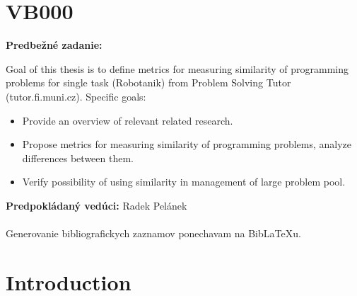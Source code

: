\documentclass[
  digital, %
  table,   %
  nolof,     %
  nolot,     %
  nocover
]{fithesis3}
\begin{document}
\chapter*{VB000}

\begin{otherlanguage}{slovak}
{\bf Predbežné zadanie:}

\noindent
Goal of this thesis is to define metrics for measuring similarity of programming problems for single task (Robotanik) from Problem Solving Tutor (tutor.fi.muni.cz). Specific goals:

\begin{itemize}
\item Provide an overview of relevant related research.
\item Propose metrics for measuring similarity of programming problems, analyze differences between them.
\item Verify possibility of using similarity in management of large problem pool.
\end{itemize}

\noindent
{\bf Predpokládaný vedúci:} Radek Pelánek
\\
\\
\noindent
Generovanie bibliografickych zaznamov ponechavam na Bib{\LaTeX}u.

\end{otherlanguage}

\chapter*{Introduction}
\end{document}
